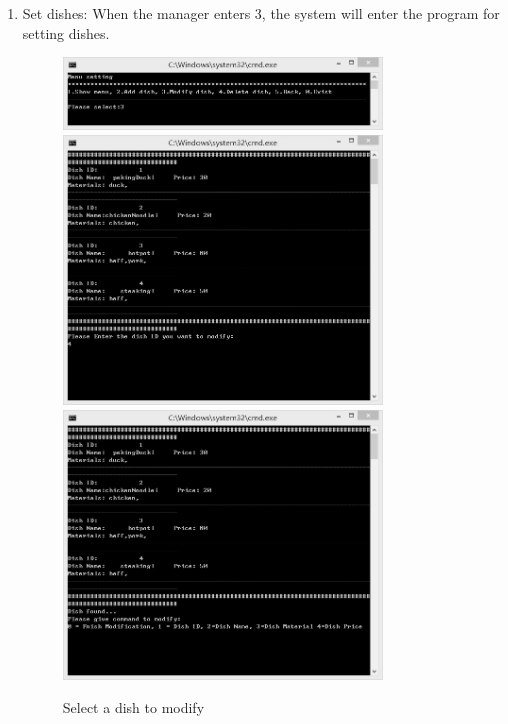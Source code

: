 \documentclass{article}
\begin{document}
\begin{enumerate}
    \item Set dishes:\newline 
    When the manager enters 3, the system will enter the program for setting dishes.
        \begin{figure}[H]
        \centering
        \includegraphics[width=0.8\textwidth]{D/D3a.jpg}
        \includegraphics[width=0.8\textwidth]{D/D3c1.jpg}
        \includegraphics[width=0.8\textwidth]{D/D3c2.jpg}
        \caption{Select a dish to modify}
        \end{figure}
        

\end{enumerate}
\end{document}
